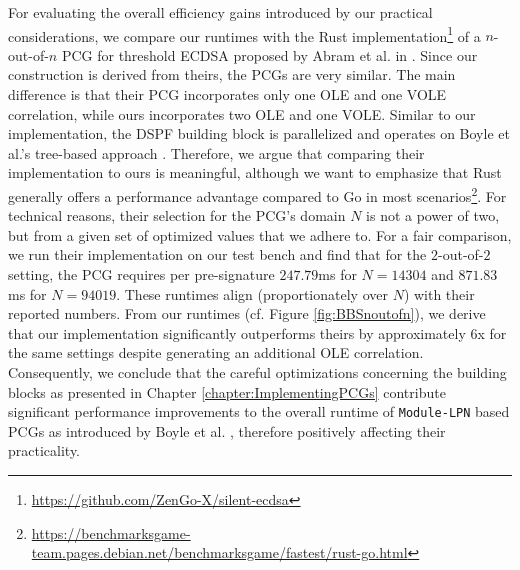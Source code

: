 For evaluating the overall efficiency gains introduced by our practical considerations, we compare our runtimes with the Rust implementation\footnote{\url{https://github.com/ZenGo-X/silent-ecdsa}} of a $n$-out-of-$n$ PCG for threshold ECDSA proposed by Abram et al. in \cite{abram2022low}. Since our construction is derived from theirs, the PCGs are very similar. The main difference is that their PCG incorporates only one OLE and one VOLE correlation, while ours incorporates two OLE and one VOLE. Similar to our implementation, the DSPF building block is parallelized and operates on Boyle et al.'s tree-based approach \cite{boyle2016function}. Therefore, we argue that comparing their implementation to ours is meaningful, although we want to emphasize that Rust generally offers a performance advantage compared to Go in most scenarios\footnote{\url{https://benchmarksgame-team.pages.debian.net/benchmarksgame/fastest/rust-go.html}}. For technical reasons, their selection for the PCG's domain $N$ is not a power of two, but from a given set of optimized values that we adhere to. For a fair comparison, we run their implementation on our test bench and find that for the $2$-out-of-$2$ setting, the PCG requires per pre-signature $247.79$ms for $N=14304$ and $871.83$ms for $N=94019$. These runtimes align (proportionately over $N$) with their reported numbers. From our runtimes (cf. Figure \ref{fig:BBSnoutofn}), we derive that our implementation significantly outperforms theirs by approximately $6$x for the same settings despite generating an additional OLE correlation. Consequently, we conclude that the careful optimizations concerning the building blocks as presented in Chapter \ref{chapter:ImplementingPCGs} contribute significant performance improvements to the overall runtime of \texttt{Module-LPN} based PCGs as introduced by Boyle et al. \cite{boyle2020efficient}, therefore positively affecting their practicality. 

